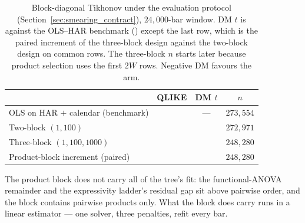 \begin{table}[H]
\centering
\caption{Block-diagonal Tikhonov under the evaluation protocol
(Section~\ref{sec:smearing_contract}), $24{,}000$-bar window.
DM $t$ is against the OLS--HAR benchmark (\unifAzeroQLIKE{}) except
the last row, which is the paired increment of the three-block design
against the two-block design on common rows. The three-block $n$
starts later because product selection uses the first $2W$ rows.
Negative DM favours the arm.
\label{tab:block_ladder}}
\begin{tabular}{@{}lccc@{}}
\toprule
 & QLIKE & DM $t$ & $n$ \\
\midrule
OLS on HAR $+$ calendar (benchmark) & \unifAzeroQLIKE{} & --- & $273{,}554$ \\
Two-block $(1, 100)$ & \unifBlkTwoUserQLIKE{} & \unifBlkTwoUserDM{} & $272{,}971$ \\
Three-block $(1, 100, 1000)$ & \unifBlkThreeUserQLIKE{} & \unifBlkThreeUserDM{} & $248{,}280$ \\
Product-block increment (paired) & \unifIncrBlkThreeUserDQ{} & \unifIncrBlkThreeUserDM{} & $248{,}280$ \\
\bottomrule
\end{tabular}
\end{table}

The product block does not carry all of the tree's fit: the
functional-ANOVA remainder and the expressivity ladder's residual gap sit
above pairwise order, and the block contains pairwise products only. What
the block does carry runs in a linear estimator --- one solver, three
penalties, refit every bar.

